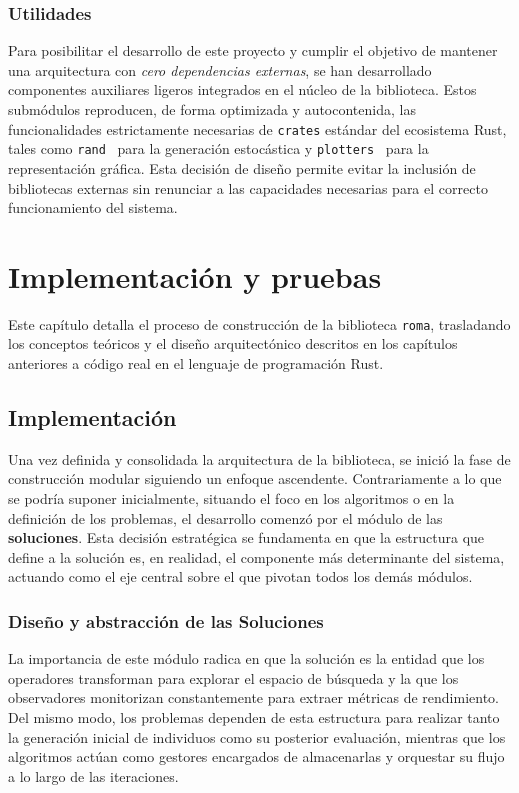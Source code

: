 \documentclass[12pt,a4paper,twoside,openright]{book}
\begin{document}
    \subsection{Utilidades}
        Para posibilitar el desarrollo de este proyecto y cumplir el objetivo de mantener una arquitectura con \emph{cero dependencias externas}, se han desarrollado componentes auxiliares ligeros integrados en el núcleo de la biblioteca. Estos submódulos reproducen, de forma optimizada y autocontenida, las funcionalidades estrictamente necesarias de \texttt{crates} estándar del ecosistema Rust, tales como \texttt{rand}~\cite{rand_crate} para la generación estocástica y \texttt{plotters}~\cite{plotters_crate} para la representación gráfica. Esta decisión de diseño permite evitar la inclusión de bibliotecas externas sin renunciar a las capacidades necesarias para el correcto funcionamiento del sistema.

\chapter{Implementación y pruebas}
    Este capítulo detalla el proceso de construcción de la biblioteca \texttt{roma}, trasladando los conceptos teóricos y el diseño arquitectónico descritos en los capítulos anteriores a código real en el lenguaje de programación Rust. 
    
    \section{Implementación}
        Una vez definida y consolidada la arquitectura de la biblioteca, se inició la fase de construcción modular siguiendo un enfoque ascendente. Contrariamente a lo que se podría suponer inicialmente, situando el foco en los algoritmos o en la definición de los problemas, el desarrollo comenzó por el módulo de las \textbf{soluciones}. Esta decisión estratégica se fundamenta en que la estructura que define a la solución es, en realidad, el componente más determinante del sistema, actuando como el eje central sobre el que pivotan todos los demás módulos.
        
    \subsection{Diseño y abstracción de las Soluciones}
        La importancia de este módulo radica en que la solución es la entidad que los operadores transforman para explorar el espacio de búsqueda y la que los observadores monitorizan constantemente para extraer métricas de rendimiento. Del mismo modo, los problemas dependen de esta estructura para realizar tanto la generación inicial de individuos como su posterior evaluación, mientras que los algoritmos actúan como gestores encargados de almacenarlas y orquestar su flujo a lo largo de las iteraciones. 
\end{document}
